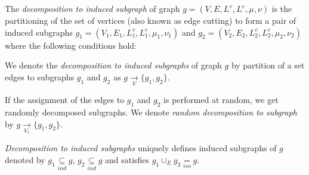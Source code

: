 \begin{definition}
\label{def:def36}
The \textit{decomposition to induced subgraph} of graph $g=(V,E,L^{v} ,L^{e} ,\mu,\nu)$ is the partitioning of the set of vertices (also known as edge cutting) to form a pair of induced subgraphs $g_1=(V_1,E_1,L_1^{v} ,L_1^{e} ,\mu_1,\nu_1)$ and $g_2=(V_2,E_2,L_2^{v} ,L_2^{e} , \mu_2, \nu_2)$ where  the following conditions hold:


We denote the \textit{decomposition to induced subgraphs} of graph $g$ by partition of a set edges to subgraphs $g_1$ and $g_2$ as $g  \underset{V}{\rightarrow} \{ g_1 , g_2 \}$.
 
If the assignment of the edges to $g_1$ and $g_2$ is performed at random, we get randomly decomposed subgraphs. We denote \textit{random decomposition to subgraph}  by $g  \underset{V_r }{\rightarrow} \{ g_1 , g_2 \}$.

\textit{Decomposition to induced subgraphs} uniquely defines induced subgraphs of $g$ denoted by  $g_{1} \underset{ind}{\subseteq} g$, $g_{2} \underset{ind}{\subseteq} g$ and satisfies $ g_{1} \cup_{E} g_{2} \underset{iso}{=} g$.

\end{definition}


